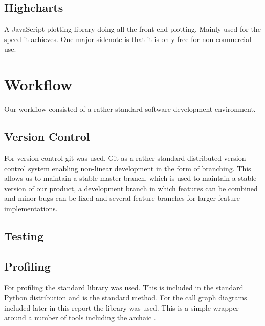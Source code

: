 \documentclass[a4paper, openany, oneside]{memoir}
\begin{document}
\subsection{Highcharts}
\label{sec:highcharts}
A JavaScript plotting library doing all the front-end plotting. Mainly used for the speed it achieves. One major sidenote is that it is only free for non-commercial use.

\section{Workflow}
\label{sec:workflow}
Our workflow consisted of a rather standard software development environment.

\subsection{Version Control}
\label{sec:version-control}
For version control git was used. Git as a rather standard distributed version control system enabling non-linear development in the form of branching. This allows us to maintain a stable master branch, which is used to maintain a stable version of our product, a development branch in which features can be combined and minor bugs can be fixed and several feature branches for larger feature implementations.

\subsection{Testing}
\label{sec:testing}


\subsection{Profiling}
\label{sec:profiling}
For profiling the standard  library was used. This is included in the standard Python distribution and is the standard method. For the call graph diagrams included later in this report the library  was used. This is a simple wrapper around a number of tools including the archaic .
\end{document}
